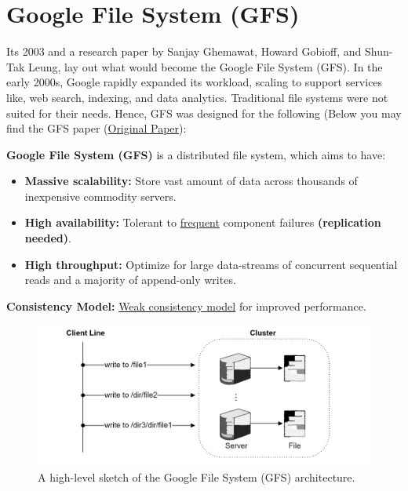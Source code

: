 \newpage 
\section{Google File System (GFS)}

Its 2003 and a research paper by Sanjay Ghemawat, Howard Gobioff, and Shun-Tak Leung, lay out
what would become the Google File System (GFS). In the early 2000s,
Google rapidly expanded its workload, scaling to support services like,
web search, indexing, and data analytics. Traditional file 
systems were not suited for their needs. Hence, GFS was designed for the following (Below you may find the GFS paper
(\href{https://static.googleusercontent.com/media/research.google.com/en//archive/gfs-sosp2003.pdf}{Original Paper}):

\begin{Def}
  
  \textbf{Google File System (GFS)} is a distributed file system, which aims to have:
  \begin{itemize}
    \item \textbf{Massive scalability:} Store vast amount of data across thousands of inexpensive commodity servers.
    \item \textbf{High availability:} Tolerant to \underline{frequent} component failures \textbf{(replication needed)}.
    \item \textbf{High throughput:} Optimize for large data-streams of concurrent sequential reads and a majority of append-only writes.
  \end{itemize}

  \noindent
  \textbf{Consistency Model:} \underline{Weak consistency model} for improved performance.
\end{Def}

\vspace{1em}
\begin{figure}[h]
  \centering
  \includegraphics[width=\textwidth]{Sections/gfs/gfs.png}
  \caption{A high-level sketch of the Google File System (GFS) architecture.}
  \label{fig:gfs-architecture}

\end{figure}

